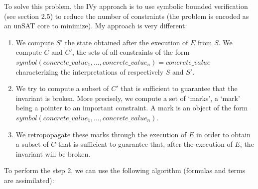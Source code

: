 \documentclass[11pt,a4paper,oldfontcommands,openany]{memoir}
\begin{document}
    To solve this problem, the IVy approach is to use symbolic bounded verification (see section 2.5) to reduce the number of constraints (the problem is encoded as an unSAT core to minimize).
    My approach is very different:
    \begin{enumerate}
        \item We compute \(S'\) the state obtained after the execution of \(E\) from \(S\).
        We compute \(C\) and \(C'\), the sets of all constraints of the form \(symbol(concrete\_value_1,\ldots,concrete\_value_n) = concrete\_value\) characterizing the interpretations of respectively \(S\) and \(S'\).
        \item We try to compute a subset of \(C'\) that is sufficient to guarantee that the invariant is broken.
        More precisely, we compute a set of `marks', a `mark' being a pointer to an important constraint.
        A mark is an object of the form \(symbol(concrete\_value_1,\ldots,concrete\_value_n)\).
        \item We retropopagate these marks through the execution of \(E\) in order to obtain a subset of \(C\) that is sufficient
        to guarantee that, after the execution of \(E\), the invariant will be broken.
    \end{enumerate}

    To perform the step 2, we can use the following algorithm (formulas and terms are assimilated):
\end{document}
